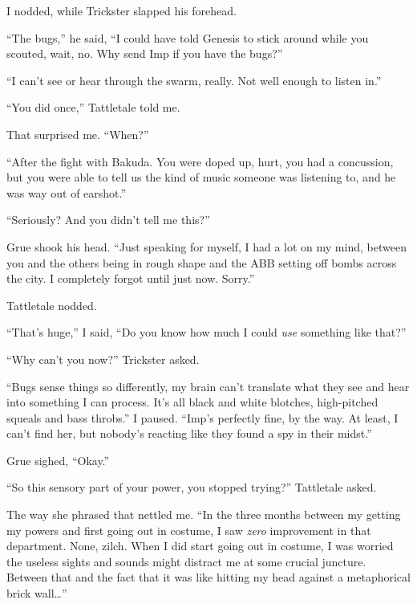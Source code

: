 I nodded, while Trickster slapped his forehead.



``The bugs,'' he said, ``I could have told Genesis to stick around while you scouted, wait, no.  Why send Imp if you have the bugs?''



``I can't see or hear through the swarm, really.  Not well enough to listen in.''



``You did once,'' Tattletale told me.



That surprised me.  ``When?''



``After the fight with Bakuda.  You were doped up, hurt, you had a concussion, but you were able to tell us the kind of music someone was listening to, and he was way out of earshot.''



``Seriously?  And you didn't tell me this?''



Grue shook his head.  ``Just speaking for myself, I had a lot on my mind, between you and the others being in rough shape and the ABB setting off bombs across the city.  I completely forgot until just now.  Sorry.''



Tattletale nodded.



``That's huge,'' I said, ``Do you know how much I could \emph{use} something like that?''



``Why can't you now?'' Trickster asked.



``Bugs sense things so differently, my brain can't translate what they see and hear into something I can process.  It's all black and white blotches, high-pitched squeals and bass throbs.''  I paused.  ``Imp's perfectly fine, by the way.  At least, I can't find her, but nobody's reacting like they found a spy in their midst.''



Grue sighed, ``Okay.''



``So this sensory part of your power, you stopped trying?'' Tattletale asked.



The way she phrased that nettled me.  ``In the three months between my getting my powers and first going out in costume, I saw \emph{zero} improvement in that department.  None, zilch.  When I did start going out in costume, I was worried the useless sights and sounds might distract me at some crucial juncture.  Between that and the fact that it was like hitting my head against a metaphorical brick wall\ldots''




